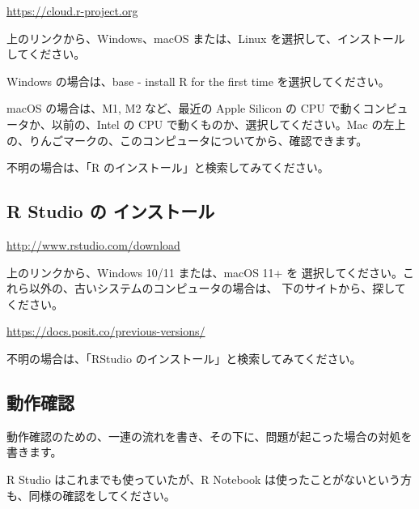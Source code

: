 \documentclass[
  xelatex, ja=standard]{bxjsbook}
\theoremstyle{definition}
\theoremstyle{definition}
\theoremstyle{definition}
\theoremstyle{definition}
\theoremstyle{remark}
\begin{document}
\url{https://cloud.r-project.org}

上のリンクから、Windows、macOS または、Linux を選択して、インストールしてください。

Windows の場合は、base - install R for the first time を選択してください。

macOS の場合は、M1, M2 など、最近の Apple Silicon の CPU で動くコンピュータか、以前の、Intel の CPU で動くものか、選択してください。Mac の左上の、りんごマークの、このコンピュータについてから、確認できます。

不明の場合は、「R のインストール」と検索してみてください。

\hypertarget{r-studio-ux306e-ux30a4ux30f3ux30b9ux30c8ux30fcux30eb}{%
\subsection{R Studio の インストール}\label{r-studio-ux306e-ux30a4ux30f3ux30b9ux30c8ux30fcux30eb}}

\url{http://www.rstudio.com/download}

上のリンクから、Windows 10/11 または、macOS 11+ を 選択してください。これら以外の、古いシステムのコンピュータの場合は、 下のサイトから、探してください。

\url{https://docs.posit.co/previous-versions/}

不明の場合は、「RStudio のインストール」と検索してみてください。

\hypertarget{ux52d5ux4f5cux78baux8a8d}{%
\subsection{動作確認}\label{ux52d5ux4f5cux78baux8a8d}}

動作確認のための、一連の流れを書き、その下に、問題が起こった場合の対処を書きます。

R Studio はこれまでも使っていたが、R Notebook は使ったことがないという方も、同様の確認をしてください。
\end{document}
